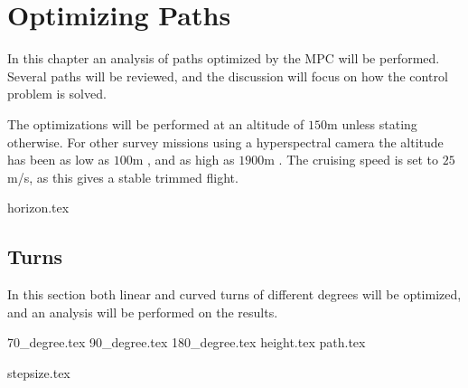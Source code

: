 \chapter{Optimizing Paths}


In this chapter an analysis of paths optimized by the MPC will be performed. Several paths will be reviewed, and the discussion will focus on how the control problem is solved.

The optimizations will be performed at an altitude of $150$m unless stating otherwise. For other survey missions using a hyperspectral camera the altitude has been as low as $100$m \cite{hymsySUOMALAINEN}, and as high as $1900$m \cite{mosaicASMAT}. The cruising speed is set to $25$m/s, as this gives a stable trimmed flight.


{horizon.tex}

\newpage
\section{Turns}

In this section both linear and curved turns of different degrees will be optimized, and an analysis will be performed on the results.

{70_degree.tex}
{90_degree.tex}
{180_degree.tex}	
\newpage
{height.tex}
\newpage
{path.tex}

{stepsize.tex}